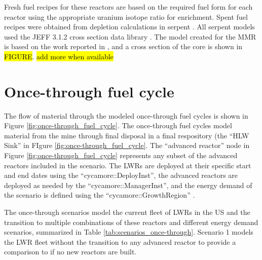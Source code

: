 Fresh fuel recipes for these reactors are based on the required fuel form for 
each reactor using the appropriate uranium isotope ratio for enrichment. Spent fuel 
recipes were obtained from depletion 
calculations in serpent \cite{leppanen_serpent_2014}. All serpent models used 
the JEFF 3.1.2 cross section data library \cite{koning_status_2011}.
The model created for the \gls{MMR} is based on the work reported in 
\cite{hawari_development_2018}, and a cross section of the core is shown in 
\hl{FIGURE}.  \hl{add more when available}

\section{Once-through fuel cycle}
The flow of material through the modeled once-through fuel cycles is shown 
in Figure \ref{fig:once-through_fuel_cycle}. The once-through fuel cycles model 
material from the mine through final disposal in a final respository (the 
``HLW Sink'' in FIgure \ref{fig:once-through_fuel_cycle}. The ``advanced reactor'' node in Figure 
\ref{fig:once-through_fuel_cycle} represents any subset of the advanced reactors included 
in the scenario. The \glspl{LWR} are deployed at their specific start and end dates 
using the ``cycamore::DeployInst'', the advanced reactors are deployed as needed by 
the ``cycamore::ManagerInst'', and the energy demand of the scenario is defined using 
the ``cycamore::GrowthRegion'' \cite{scopatz_cyclus_2015}.



The once-through scenarios model the current fleet of \glspl{LWR} in the 
US and the transition to multiple 
combinations of these reactors and different energy demand scenarios, 
summarized in Table \ref{tab:scenarios_once-through}. Scenario 1 models
the \gls{LWR} fleet without the transition to any advanced reactor to provide 
a comparison to if no new reactors are built.  

